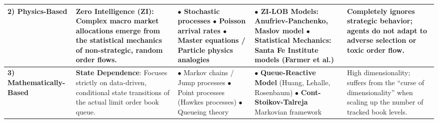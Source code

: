 \documentclass[12pt,a4paper]{cau_thesis}
\begin{document}
\begin{table}[htbp]
\begin{tabularx}{\textwidth}{l >{\raggedright\arraybackslash}X >{\raggedright\arraybackslash}X >{\raggedright\arraybackslash}X >{\raggedright\arraybackslash}X}
        \textbf{2) Physics-Based}                                                                                                                                                          &
        \textbf{Zero Intelligence (ZI)}: Complex macro market allocations emerge from the statistical mechanics of non-strategic, random order flows.                                      &
        $\bullet$ Stochastic processes \newline $\bullet$ Poisson arrival rates \newline $\bullet$ Master equations / Particle physics analogies                                           &
        $\bullet$ \textbf{ZI-LOB Models}: Anufriev-Panchenko, Maslov model \newline $\bullet$ \textbf{Statistical Mechanics}: Santa Fe Institute models (Farmer et al.)                    &
        Completely ignores strategic behavior; agents do not adapt to adverse selection or toxic order flow.                                                                                                                                                                                                                                                       \\
        \midrule

        \textbf{3) Mathematically-Based}                                                                                                                                                   &
        \textbf{State Dependence}: Focuses strictly on data-driven, conditional state transitions of the actual limit order book queue.                                                    &
        $\bullet$ Markov chains / Jump processes \newline $\bullet$ Point processes (Hawkes processes) \newline $\bullet$ Queueing theory                                                  &
        $\bullet$ \textbf{Queue-Reactive Model} (Huang, Lehalle, Rosenbaum) \newline $\bullet$ \textbf{Cont-Stoikov-Talreja} Markovian framework                                           &
        High dimensionality; suffers from the ``curse of dimensionality'' when scaling up the number of tracked book levels.                                                                                                                                                                                                                                       \\
        \bottomrule
    \end{tabularx}
    \label{tab:market_making_frameworks}
\end{table}
\end{document}
